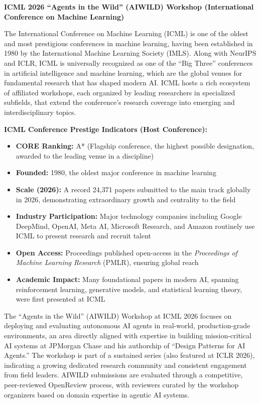 \textbf{ICML 2026 ``Agents in the Wild'' (AIWILD) Workshop (International Conference on Machine Learning)}

The International Conference on Machine Learning (ICML) is one of the oldest and most prestigious conferences in machine learning, having been established in 1980 by the International Machine Learning Society (IMLS). Along with NeurIPS and ICLR, ICML is universally recognized as one of the ``Big Three'' conferences in artificial intelligence and machine learning, which are the global venues for fundamental research that has shaped modern AI. ICML hosts a rich ecosystem of affiliated workshops, each organized by leading researchers in specialized subfields, that extend the conference's research coverage into emerging and interdisciplinary topics.

\textbf{ICML Conference Prestige Indicators (Host Conference):}
\begin{itemize}
    \item \textbf{CORE Ranking:} A* (Flagship conference, the highest possible designation, awarded to the leading venue in a discipline)
    \item \textbf{Founded:} 1980, the oldest major conference in machine learning
    \item \textbf{Scale (2026):} A record 24,371 papers submitted to the main track globally in 2026, demonstrating extraordinary growth and centrality to the field
    \item \textbf{Industry Participation:} Major technology companies including Google DeepMind, OpenAI, Meta AI, Microsoft Research, and Amazon routinely use ICML to present research and recruit talent
    \item \textbf{Open Access:} Proceedings published open-access in the \textit{Proceedings of Machine Learning Research} (PMLR), ensuring global reach
    \item \textbf{Academic Impact:} Many foundational papers in modern AI, spanning reinforcement learning, generative models, and statistical learning theory, were first presented at ICML
\end{itemize}

The ``Agents in the Wild'' (AIWILD) Workshop at ICML 2026 focuses on deploying and evaluating autonomous AI agents in real-world, production-grade environments, an area directly aligned with \drs expertise in building mission-critical AI systems at JPMorgan Chase and his authorship of ``Design Patterns for AI Agents.'' The workshop is part of a sustained series (also featured at ICLR 2026), indicating a growing dedicated research community and consistent engagement from field leaders. AIWILD submissions are evaluated through a competitive, peer-reviewed OpenReview process, with reviewers curated by the workshop organizers based on domain expertise in agentic AI systems.

